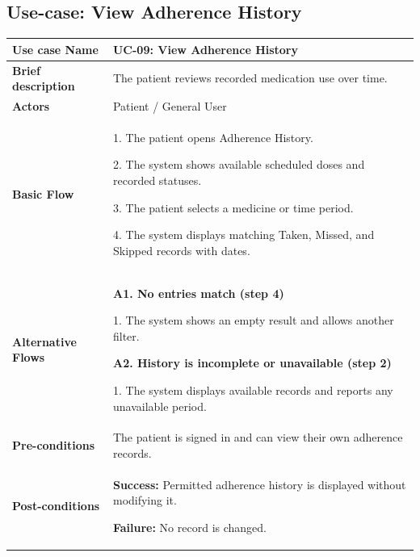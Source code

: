 \clearpage
\subsection{Use-case: View Adherence History}
\label{uc:uc-09}
\begin{longtable}{|p{}|p{}|}
\hline
\textbf{Use case Name} & UC-09: View Adherence History \\ \hline
\textbf{Brief description} & The patient reviews recorded medication use over time. \\ \hline
\textbf{Actors} & Patient / General User \\ \hline
\textbf{Basic Flow} &
1. The patient opens Adherence History.\par
2. The system shows available scheduled doses and recorded statuses.\par
3. The patient selects a medicine or time period.\par
4. The system displays matching Taken, Missed, and Skipped records with dates.
\\ \hline
\textbf{Alternative Flows} &
\textbf{A1. No entries match (step 4)}\par
1. The system shows an empty result and allows another filter.
\par\smallskip
\textbf{A2. History is incomplete or unavailable (step 2)}\par
1. The system displays available records and reports any unavailable period.
\\ \hline
\textbf{Pre-conditions} & The patient is signed in and can view their own adherence records. \\ \hline
\textbf{Post-conditions} & \textbf{Success:} Permitted adherence history is displayed without modifying it.\par
\textbf{Failure:} No record is changed. \\ \hline
\end{longtable}


\clearpage
